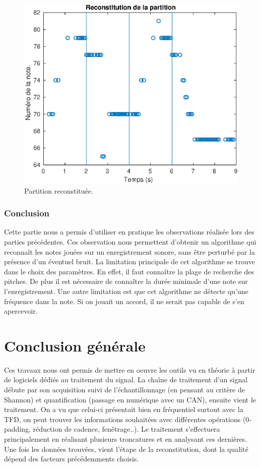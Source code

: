 \documentclass[french]{article}
\begin{document}
\begin{figure}[h!]
	\centering
	\includegraphics[width=\textwidth]{images/notes.eps}
	\caption{Partition reconstituée.}
	\label{fig:notes}
\end{figure}

\section*{Conclusion}

Cette partie nous a permis d'utiliser en pratique les observations réalisée lors des parties précédentes. Ces observation nous permettent d'obtenir un algorithme qui reconnaît les notes jouées sur un enregistrement sonore, sans être perturbé par la présence d'un éventuel bruit. La limitation principale de cet algorithme se trouve dans le choix des paramètres. En effet, il faut connaître la plage de recherche des pitches. De plus il est nécessaire de connaître la durée minimale d'une note sur l'enregistrement. Une autre limitation est que cet algorithme ne détecte qu'une fréquence dans la note. Si on jouait un accord, il ne serait pas capable de s'en apercevoir. 

\newpage
\part{Conclusion générale}
Ces travaux nous ont permis de mettre en oeuvre les outils vu en théorie à partir de logiciels dédiés au traitement du signal. La chaîne de traitement d'un signal débute par son acquisition suivi de l'échantillonnage (en pensant au critère de Shannon) et quantification (passage en numérique avec un CAN), ensuite vient le traitement. On a vu que celui-ci présentait bien en fréquentiel surtout avec la TFD, on peut trouver les informations souhaitées avec différentes opérations (0-padding, réduction de cadence, fenêtrage..). Le traitement s'effectuera principalement en réalisant plusieurs troncatures et en analysant ces dernières. Une fois les données trouvées, vient l'étape de la reconstitution, dont la qualité dépend des facteurs précédemments choisis.
\end{document}

